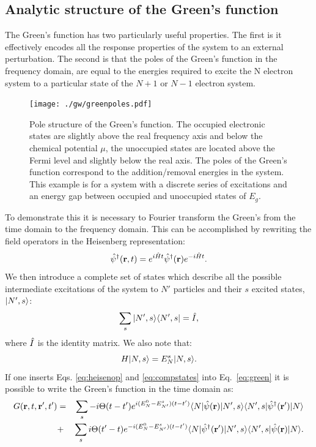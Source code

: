 \subsection{Analytic structure of the Green's function}
\noindent
The Green's function has two particularly useful properties. 
The first is it effectively encodes all the response properties of the 
system to an external perturbation. The second is that the 
poles of the Green's function in the frequency domain, are
equal to the energies required to excite the N electron system to
a particular state of the $N+1$ or $N-1$ electron system.
%
\begin{figure}[tb]
\begin{center}
\texttt{[image: ./gw/greenpoles.pdf]}
\end{center}
\caption{\small \label{fig:greenpoles} Pole structure 
of the Green's function. 
The occupied electronic states are
slightly above the real frequency axis and below the chemical 
potential $\mu$, the unoccupied states are located above the Fermi
level and slightly below the real axis. The poles of the Green's 
function correspond to the addition/removal energies 
in the system. This example is for a system with a discrete series of 
excitations and an energy gap between occupied and unoccupied states
of $E_{g}$.}
\end{figure}
%
To demonstrate this it is necessary to Fourier transform the Green's from the time
domain to the frequency domain. This can be accomplished by 
rewriting the field operators in the Heisenberg representation:
%
\begin{equation}
\label{eq:heisenop}
\hat{\psi}^{\dagger}({\bf r},t) = e^{i\hat{H}t}\hat{\psi}^{\dagger}({\bf r}) e^{-i\hat{H}t}.
\end{equation}
%
We then introduce a complete set of states which describe all the possible 
intermediate excitations of the system to $N'$ particles 
and their $s$ excited states,~$|N',s\rangle$:
%
\begin{equation}
\label{eq:compstates}
\sum_{s}|N', s\rangle \langle N',s| = \hat{I},
\end{equation}
%
where $\hat{I}$ is the identity matrix.
We also note that:
%
\begin{equation}
H|N,s\rangle = E^{s}_{N}|N,s\rangle.
\end{equation}
%
%
If one inserts Eqs. \ref{eq:heisenop} and \ref{eq:compstates} into Eq.~\ref{eq:green} it is possible 
to write the Green's function in the time domain as:
%
\begin{align}
\label{eq:grtimedom}
G({\bf r},t,{\bf r^\prime},t') & = & \sum_{s} -i\Theta(t-t') e^{i(E^{0}_{N} - E_{N'}^{s})(t-t')}\langle N|\hat{\psi}({\bf r})|N',s\rangle\langle N',s|\hat{\psi}^{\dagger}({\bf r}')|N\rangle \nonumber \\
	  &+ & \sum_{s} i\Theta(t'-t) e^{-i(E_{N}^{0} - E^{s}_{N'})(t-t')}\langle N|\hat{\psi}^{\dagger}({\bf r}') |N',s\rangle \langle N',s|\hat{\psi}({\bf r})| N \rangle.
\end{align}

